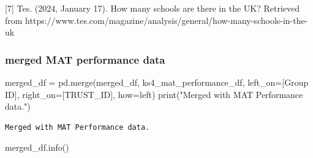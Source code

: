 \documentclass[
  letterpaper,
  DIV=11,
  numbers=noendperiod]{scrartcl}
\newenvironment{Shaded}{\begin{snugshade}}{\end{snugshade}}
\newcommand{\BuiltInTok}[1]{\textcolor[rgb]{0.00,0.23,0.31}{#1}}
\newcommand{\NormalTok}[1]{\textcolor[rgb]{0.00,0.23,0.31}{#1}}
\newcommand{\OperatorTok}[1]{\textcolor[rgb]{0.37,0.37,0.37}{#1}}
\newcommand{\StringTok}[1]{\textcolor[rgb]{0.13,0.47,0.30}{#1}}
\begin{document}
{[}7{]} Tes. (2024, January 17). How many schools are there in the UK?
Retrieved from
https://www.tes.com/magazine/analysis/general/how-many-schools-in-the-uk

\subsubsection{merged MAT performance
data}\label{merged-mat-performance-data}

\begin{Shaded}
\begin{Highlighting}[]
\NormalTok{merged\_df }\OperatorTok{=}\NormalTok{ pd.merge(merged\_df, ks4\_mat\_performance\_df, left\_on}\OperatorTok{=}\NormalTok{[}\StringTok{\textquotesingle{}Group ID\textquotesingle{}}\NormalTok{], right\_on}\OperatorTok{=}\NormalTok{[}\StringTok{\textquotesingle{}TRUST\_ID\textquotesingle{}}\NormalTok{], how}\OperatorTok{=}\StringTok{\textquotesingle{}left\textquotesingle{}}\NormalTok{)}
\BuiltInTok{print}\NormalTok{(}\StringTok{"Merged with MAT Performance data."}\NormalTok{)}
\end{Highlighting}
\end{Shaded}

\begin{verbatim}
Merged with MAT Performance data.
\end{verbatim}

\begin{Shaded}
\begin{Highlighting}[]
\NormalTok{merged\_df.info()}
\end{Highlighting}
\end{Shaded}
\end{document}
